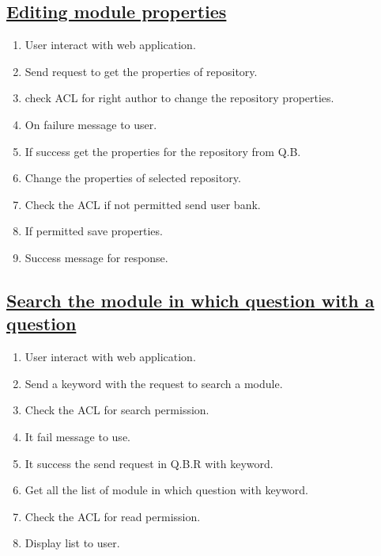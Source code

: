 \documentclass{article}
\begin{document}
\subsection*{\underline{Editing module properties}} 
\begin{enumerate}
\item User interact with web application. 
\item Send request to get the properties of repository. 
\item check ACL for right author to change the repository properties. 
\item On failure message to user. 
\item If success get the properties for the repository from Q.B. 
\item Change the properties of selected repository. 
\item Check the ACL if not permitted send user bank. 
\item If permitted save properties. 
\item Success message for response.
\begin{center}

\end{center}
\end{enumerate}

\subsection*{\underline{Search the module in which question with a question}} 
\begin{enumerate}
\item User interact with web application. 
\item Send a keyword with the request to search a module. 
\item Check the ACL for search permission. 
\item It fail message to use. 
\item It success the send request in Q.B.R with keyword. 
\item Get all the list of module in which question with keyword. 
\item Check the ACL for read permission. 
\item Display list to user.
\begin{center}

\label{figure:searchthemodulein.latex}
\end{center}
\end{enumerate}
\end{document}
